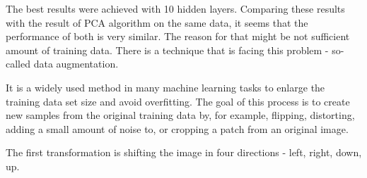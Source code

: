 The best results were achieved with 10 hidden layers. Comparing these results with the result of PCA algorithm on the same data, it seems that the performance of both is very similar. The reason for that might be not sufficient amount of training data. There is a technique that is facing this problem - so-called data augmentation.

It is a widely used method in many machine learning tasks to enlarge the training data set size and avoid overfitting. The goal of this process is to create new samples from the original training data by, for example, flipping, distorting, adding a small amount of noise to, or cropping a patch from an original image.

The first transformation is shifting  the image in four directions - left, right, down, up.


